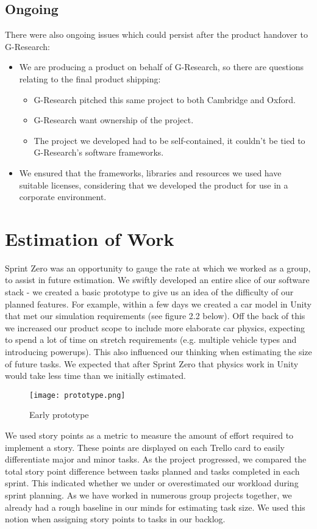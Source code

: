 \subsection{Ongoing}
There were also ongoing issues which could persist after the product handover to G-Research:
\begin{itemize}
\item We are producing a product on behalf of G-Research, so there are questions relating to the final product shipping:
\begin{itemize}
\item G-Research pitched this same project to both Cambridge and Oxford.
\item G-Research want ownership of the project.
\item The project we developed had to be self-contained, it couldn't be tied to G-Research's software frameworks.
\end{itemize}
\item We ensured that the frameworks, libraries and resources we used have suitable licenses, considering that we developed the product for use in a corporate environment.
\end{itemize}

\section{Estimation of Work}
Sprint Zero was an opportunity to gauge the rate at which we worked as a group, to assist in future estimation. We swiftly developed an entire slice of our software stack - we created a basic prototype to give us an idea of the difficulty of our planned features. For example, within a few days we created a car model in Unity that met our simulation requirements (see figure 2.2 below). Off the back of this we increased our product scope to include more elaborate car physics, expecting to spend a lot of time on stretch requirements (e.g. multiple vehicle types and introducing powerups). This also influenced our thinking when estimating the size of future tasks. We expected that after Sprint Zero that physics work in Unity would take less time than we initially estimated.


\begin{figure}[H]
\centering
\texttt{[image: prototype.png]}
\caption{Early prototype}
\end{figure}

We used story points as a metric to measure the amount of effort required to implement a story. These points are displayed on each Trello card to easily differentiate major and minor tasks. As the project progressed, we compared the total story point difference between tasks planned and tasks completed in each sprint. This indicated whether we under or overestimated our workload during sprint planning. As we have worked in numerous group projects together, we already had a rough baseline in our minds for estimating task size. We used this notion when assigning story points to tasks in our backlog.

